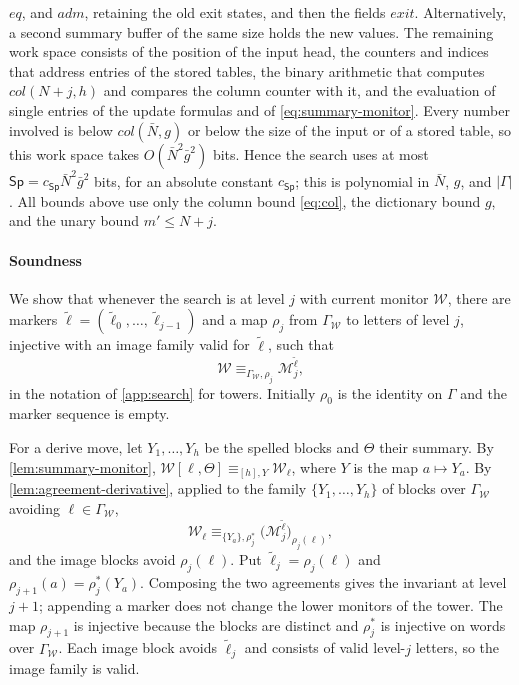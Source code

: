 $\mathit{eq}$, and $\mathit{adm}$, retaining the old exit states, and then
the fields $\mathit{exit}$. Alternatively, a second summary buffer of the
same size holds the new values. The remaining work space consists of the
position of the input head, the counters and indices that address entries of
the stored tables, the binary arithmetic that computes
$\mathit{col}(N+j,h)$ and compares the column counter with it, and the
evaluation of single entries of the update formulas and of
\eqref{eq:summary-monitor}. Every number involved is below
$\mathit{col}(\bar N,g)$ or below the size of the input or of a stored table,
so this work space takes $O(\bar N^2\bar g^2)$ bits. Hence the search uses at
most $\mathsf{Sp}=c_{\mathsf{Sp}}\bar N^2\bar g^2$ bits, for an absolute
constant $c_{\mathsf{Sp}}$; this is polynomial in $\bar N$, $g$, and
$|\Gamma|$. All bounds above use only the column bound \eqref{eq:col}, the
dictionary bound $g$, and the unary bound $m'\le N+j$.

\paragraph{Soundness}
We show that whenever the search is at level $j$ with current monitor
$\mathcal W$, there are markers
$\widetilde{\boldsymbol\ell}=(\widetilde\ell_0,\ldots,\widetilde\ell_{j-1})$
and a map $\rho_j$ from $\Gamma_{\mathcal W}$ to letters of level $j$,
injective with an image family valid for $\widetilde{\boldsymbol\ell}$, such
that
\[
 \mathcal W\equiv_{\Gamma_{\mathcal W},\rho_j}
 \mathcal M^{\widetilde{\boldsymbol\ell}}_j ,
\]
in the notation of \cref{app:search} for towers. Initially $\rho_0$ is the
identity on $\Gamma$ and the marker sequence is empty.

For a derive move, let $Y_1,\ldots,Y_h$ be the spelled blocks and $\Theta$
their summary. By \cref{lem:summary-monitor},
$\mathcal W[\ell,\Theta]\equiv_{[h],Y}\mathcal W_\ell$, where $Y$ is the map
$a\mapsto Y_a$. By \cref{lem:agreement-derivative}, applied to the family
$\{Y_1,\ldots,Y_h\}$ of blocks over $\Gamma_{\mathcal W}$ avoiding
$\ell\in\Gamma_{\mathcal W}$,
\[
 \mathcal W_\ell\equiv_{\{Y_a\},\rho_j^*}
 \bigl(\mathcal M^{\widetilde{\boldsymbol\ell}}_j\bigr)_{\rho_j(\ell)},
\]
and the image blocks avoid $\rho_j(\ell)$. Put
$\widetilde\ell_j=\rho_j(\ell)$ and $\rho_{j+1}(a)=\rho_j^*(Y_a)$. Composing
the two agreements gives the invariant at level $j+1$; appending a marker
does not change the lower monitors of the tower. The map $\rho_{j+1}$ is
injective because the blocks are distinct and $\rho_j^*$ is injective on
words over $\Gamma_{\mathcal W}$. Each image block avoids $\widetilde\ell_j$
and consists of valid level-$j$ letters, so the image family is valid.

